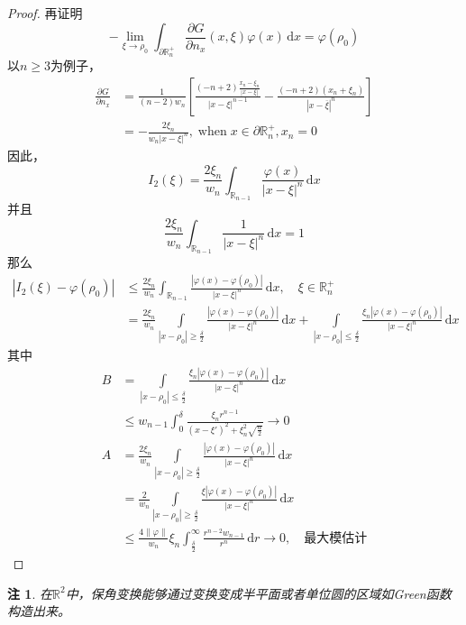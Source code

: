 \documentclass[11pt, a4paper]{article}
\theoremstyle{theorem}
\newtheorem*{note}{注}
\newcommand{\intd}[1]{\,\mathrm{d}{#1}}
\begin{document}
\begin{proof}
再证明
$$
- \lim\limits_{\xi \rightarrow \rho_0} \int_{\partial \mathbb{R}_n^+} \frac{\partial G}{\partial n_x} (x,\xi) \varphi(x) \intd x = \varphi(\rho_0)
$$
以$n \geq 3$为例子，
\begin{align*}
    \frac{\partial G}{\partial n_x} &= \frac{1}{(n-2)w_n} \left[\frac{(-n+2)\frac{x_n - \xi_n}{|x - \xi|}}{|x - \xi|^{n-1}} - \frac{(-n+2)(x_n + \xi_n)}{|x - \overline{\xi}|^n}\right] \\
    &= - \frac{2 \xi_n}{w_n |x - \xi|^n}, \; \text{when} \; x \in \partial \mathbb{R}_n^+, x_n = 0
\end{align*}
因此，
$$
I_2(\xi) = \frac{2 \xi_n}{w_n} \int_{\mathbb{R}_{n-1}} \frac{\varphi(x)}{|x - \xi|^n} \intd x
$$
并且
$$
\frac{2 \xi_n}{w_n} \int_{\mathbb{R}_{n-1}} \frac{1}{|x - \xi|^n} \intd x = 1
$$
那么
\begin{align*}
    \left|I_2(\xi) - \varphi(\rho_0)\right|
    &\leq \frac{2 \xi_n}{w_n} \int_{\mathbb{R}_{n-1}} \frac{|\varphi(x) - \varphi(\rho_0)|}{|x - \xi|^n} \intd x, \quad \xi \in \mathbb{R}_n^+ \\
    &= \frac{2 \xi_n}{w_n} \int\limits_{|x - \rho_0| \geq \frac{\delta}{2}} \frac{|\varphi(x) - \varphi(\rho_0)|}{|x - \xi|^n} \intd x + \int\limits_{|x - \rho_0| \leq \frac{\delta}{2}} \frac{\xi_n|\varphi(x) - \varphi(\rho_0)|}{|x - \xi|^n} \intd x
\end{align*}
其中
\begin{align*}
    B &= \int\limits_{|x - \rho_0| \leq \frac{\delta}{2}} \frac{\xi_n|\varphi(x) - \varphi(\rho_0)|}{|x - \xi|^n} \intd x \\
    &\leq w_{n-1} \int_0^\delta \frac{\xi_n r^{n-1}}{(x - \xi')^2 + \xi_n^2 \sqrt{\frac{\alpha}{2}}} \longrightarrow 0 \\
    A &= \frac{2 \xi_n}{w_n} \int\limits_{|x - \rho_0| \geq \frac{\delta}{2}} \frac{|\varphi(x) - \varphi(\rho_0)|}{|x - \xi|^n} \intd x \\
    &= \frac{2}{w_n} \int\limits_{|x - \rho_0| \geq \frac{\delta}{2}} \frac{\xi |\varphi(x) - \varphi(\rho_0)|}{|x - \xi|^n} \intd x \\
    &\leq \frac{4 \|\varphi\|}{w_n} \xi_n \int_{\frac{\delta}{2}}^\infty \frac{r^{n-2}w_{n-1}}{r^n} \intd r \longrightarrow 0, \quad \text{最大模估计}
\end{align*}
\end{proof}

\begin{note}
在$\mathbb{R}^2$中，保角变换能够通过变换变成半平面或者单位圆的区域如Green函数构造出来。
\end{note}
\end{document}

